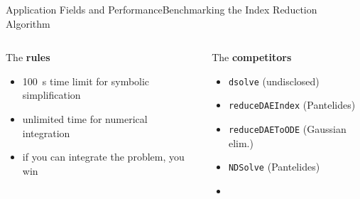 \begin{frame}{Application Fields and Performance}{Benchmarking the Index Reduction Algorithm}
  \vspace{-1.0em}
  \begin{columns}
    \begin{column}[t]{0.5\textwidth}
      The \textbf{rules}
      \begin{itemize}\small
        \setlength{\itemsep}{0.0em}
        \item[\raisebox{-1pt}{\scalebox{0.8}{\faHourglassHalf}\,}] \SI{100}{\second} time limit for symbolic simplification
        \item[\raisebox{-1pt}{\scalebox{0.8}{\faInfinity}}] unlimited time for numerical integration
        \item[\raisebox{-1pt}{\scalebox{0.8}{\faCheck}}] if you can integrate the problem, you win
      \end{itemize}
    \end{column}
    \begin{column}[t]{0.5\textwidth}
      The \textbf{competitors} \\
      \begin{itemize}\small
        \setlength{\itemsep}{0.0em}
        \item \Maple{} \texttt{dsolve} (undisclosed)
        \item \Matlab{} \texttt{reduceDAEIndex} (Pantelides)
        \item \Matlab{} \texttt{reduceDAEToODE} (Gaussian elim.)
        \item \Mathematica{} \texttt{NDSolve} (Pantelides)
        \item {}
      \end{itemize}
    \end{column}
  \end{columns}
  \vspace{0.5em}%
\end{frame}
